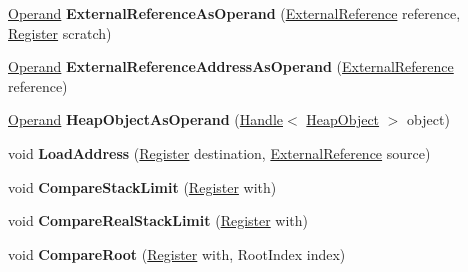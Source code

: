 \begin{DoxyCompactItemize}
\mbox{\hyperlink{classv8_1_1internal_1_1Operand}{Operand}} {\bfseries External\+Reference\+As\+Operand} (\mbox{\hyperlink{classv8_1_1internal_1_1ExternalReference}{External\+Reference}} reference, \mbox{\hyperlink{classv8_1_1internal_1_1Register}{Register}} scratch)
\item 
\mbox{\label{classv8_1_1internal_1_1TurboAssembler_afba30d45a994645307b69ce92c3b18ed}} 
\mbox{\hyperlink{classv8_1_1internal_1_1Operand}{Operand}} {\bfseries External\+Reference\+Address\+As\+Operand} (\mbox{\hyperlink{classv8_1_1internal_1_1ExternalReference}{External\+Reference}} reference)
\item 
\mbox{\label{classv8_1_1internal_1_1TurboAssembler_a3e15d4f2333cb2efda5dd050f1107a49}} 
\mbox{\hyperlink{classv8_1_1internal_1_1Operand}{Operand}} {\bfseries Heap\+Object\+As\+Operand} (\mbox{\hyperlink{classv8_1_1internal_1_1Handle}{Handle}}$<$ \mbox{\hyperlink{classv8_1_1internal_1_1HeapObject}{Heap\+Object}} $>$ object)
\item 
\mbox{\label{classv8_1_1internal_1_1TurboAssembler_a3ad77e343976506ca4be04cd3552f27a}} 
void {\bfseries Load\+Address} (\mbox{\hyperlink{classv8_1_1internal_1_1Register}{Register}} destination, \mbox{\hyperlink{classv8_1_1internal_1_1ExternalReference}{External\+Reference}} source)
\item 
\mbox{\label{classv8_1_1internal_1_1TurboAssembler_afa6125f75296297f5261c44af19f64e7}} 
void {\bfseries Compare\+Stack\+Limit} (\mbox{\hyperlink{classv8_1_1internal_1_1Register}{Register}} with)
\item 
\mbox{\label{classv8_1_1internal_1_1TurboAssembler_a6e61c16d8029cf5f6ad7fa844237b717}} 
void {\bfseries Compare\+Real\+Stack\+Limit} (\mbox{\hyperlink{classv8_1_1internal_1_1Register}{Register}} with)
\item 
\mbox{\label{classv8_1_1internal_1_1TurboAssembler_ad22871c6fa3a55bf58c048ac24c6aa90}} 
void {\bfseries Compare\+Root} (\mbox{\hyperlink{classv8_1_1internal_1_1Register}{Register}} with, Root\+Index index)
\item 

\end{DoxyCompactItemize}
